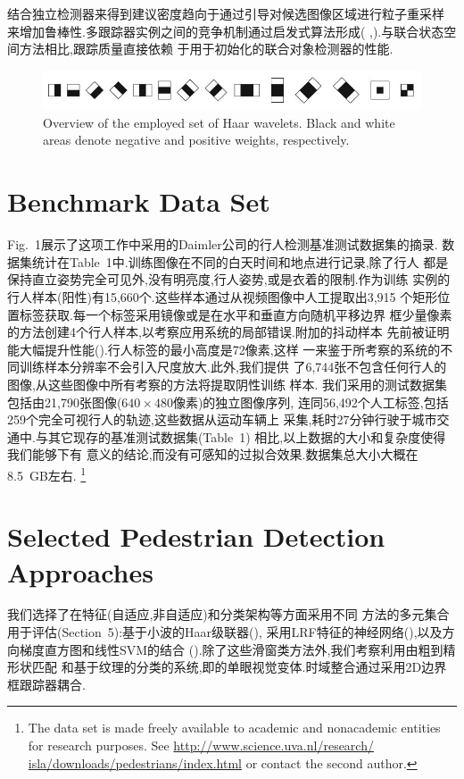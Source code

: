 \documentclass[10pt,letterpaper,journal,compsoc]{IEEEtran}
\begin{document}
结合独立检测器来得到建议密度趋向于通过引导对候选图像区域进行粒子重采样
来增加鲁棒性.多跟踪器实例之间的竞争机制通过启发式算法形成(
\cite{bib35},\cite{bib50}).与联合状态空间方法相比,跟踪质量直接依赖
于用于初始化的联合对象检测器的性能.
\begin{figure}[!t]
\centering
\includegraphics[width=5in]{fig2.JPG}
\caption{Overview of the employed set of Haar wavelets. Black and white areas denote negative and positive weights, respectively.}
\end{figure}
\section{Benchmark Data Set}
Fig.~1展示了这项工作中采用的Daimler公司的行人检测基准测试数据集的摘录.
数据集统计在Table~1中.训练图像在不同的白天时间和地点进行记录,除了行人
都是保持直立姿势完全可见外,没有明亮度,行人姿势,或是衣着的限制.作为训练
实例的行人样本(阳性)有15,660个.这些样本通过从视频图像中人工提取出3,915
个矩形位置标签获取.每一个标签采用镜像或是在水平和垂直方向随机平移边界
框少量像素的方法创建4个行人样本,以考察应用系统的局部错误.附加的抖动样本
先前被证明能大幅提升性能(\cite{bib14}).行人标签的最小高度是72像素,这样
一来鉴于所考察的系统的不同训练样本分辨率不会引入尺度放大.此外,我们提供
了6,744张不包含任何行人的图像,从这些图像中所有考察的方法将提取阴性训练
样本.
我们采用的测试数据集包括由21,790张图像($640\times480$像素)的独立图像序列,
连同56,492个人工标签,包括259个完全可视行人的轨迹,这些数据从运动车辆上
采集,耗时27分钟行驶于城市交通中.与其它现存的基准测试数据集(Table~1)
相比,以上数据的大小和复杂度使得我们能够下有
意义的结论,而没有可感知的过拟合效果.数据集总大小大概在8.5~GB左右.
\footnote{The data set is made freely available to academic and nonacademic
entities for research purposes. See \url{http://www.science.uva.nl/research/
isla/downloads/pedestrians/index.html} or contact the second author.}
\section{Selected Pedestrian Detection Approaches}

我们选择了在特征(自适应,非自适应)和分类架构等方面采用不同
方法的多元集合用于评估(Section~5):基于小波的Haar级联器(\cite{bib74}),
采用LRF特征的神经网络(\cite{bib75}),以及方向梯度直方图和线性SVM的结合
(\cite{bib11}).除了这些滑窗类方法外,我们考察利用由粗到精形状匹配
和基于纹理的分类的系统,即\cite{bib23}的单眼视觉变体.时域整合通过采用2D边界
框跟踪器耦合.
\end{document}
